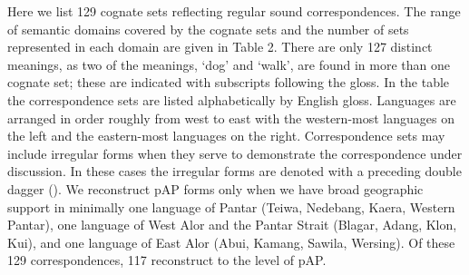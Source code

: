 Here we list 129 cognate sets reflecting regular sound correspondences. The range of semantic domains covered by the cognate sets and the number of sets represented in each domain are given in Table 2. There are only 127 distinct meanings, as two of the meanings, `dog' and `walk', are found in more than one cognate set; these are indicated with subscripts following the gloss. In the table the correspondence sets are listed alphabetically by English gloss. Languages are arranged in order roughly from west to east with the western-most languages on the left and the eastern-most languages on the right. Correspondence sets may include irregular forms when they serve to demonstrate the correspondence under discussion. In these cases the irregular forms are denoted with a preceding double dagger ({\ddag}). We reconstruct pAP forms only when we have broad geographic support in minimally one language of Pantar (Teiwa, Nedebang, Kaera, Western Pantar), one language of West Alor and the Pantar Strait (Blagar, Adang,
Klon, Kui), and one language of East Alor (Abui, Kamang, Sawila, Wersing). Of these 129 correspondences, 117 reconstruct to the level of pAP.

